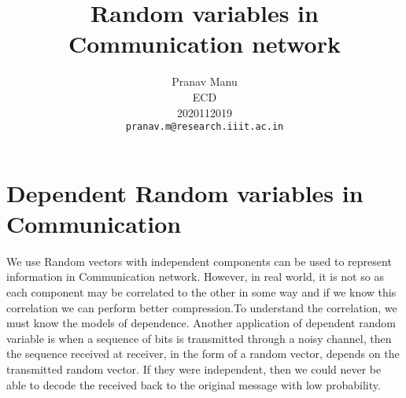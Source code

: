 \documentclass[10pt,twocolumn,letterpaper]{article}
\begin{document}
\title{Random variables in Communication network}

\author{Pranav Manu\\
ECD\\
2020112019\\
{\tt\small pranav.m@research.iiit.ac.in}
}

\maketitle


\section{Dependent Random variables in Communication}

We use Random vectors with independent components can be used to represent information in Communication network. However, in real world, it is not so as each component may be correlated to the other in some way and if we know this correlation we can perform better compression.To understand the correlation, we must know the models of dependence. Another application of dependent random variable is when a sequence of bits is transmitted through a noisy channel, then the sequence received at receiver, in the form of a random vector, depends on the transmitted random vector. If they were independent, then we could never be able to decode the received back to the original message with low probability.
\end{document}
